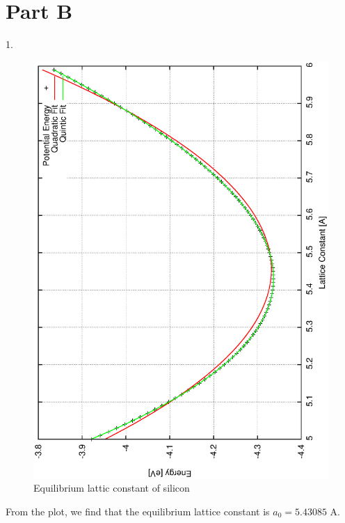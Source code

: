 \documentclass{article}
\begin{document}
\section{Part B}

1.
\begin{figure}[h!]
\centering
\includegraphics[totalheight=0.5\textheight, angle=-90]{pe_curve}
\caption{Equilibrium lattic constant of silicon}
\label{fig:aNicePicture}
\end{figure}
From the plot, we find that the equilibrium lattice constant is $a_0=5.43085$ A.\\
\end{document}
